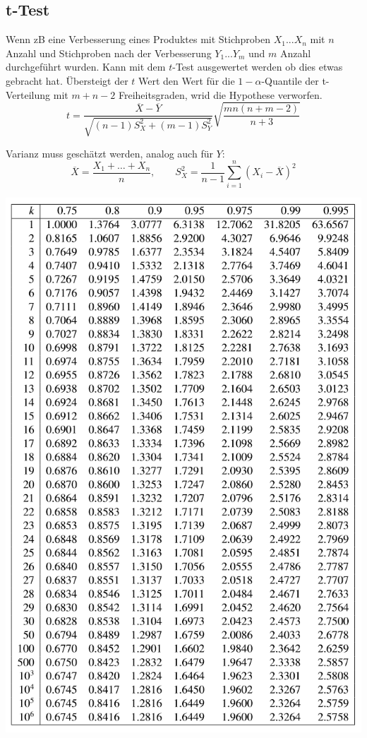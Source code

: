 \subsection{t-Test}
Wenn zB eine Verbesserung eines Produktes mit Stichproben $X_1...X_n$ mit $n$ Anzahl und Stichproben nach der Verbesserung $Y_1...Y_m$ und $m$ Anzahl durchgeführt wurden. Kann mit dem $t$-Test ausgewertet werden ob dies etwas gebracht hat. Übersteigt der $t$ Wert den Wert für die $1-\alpha$-Quantile der t-Verteilung  mit $m+n-2$ Freiheitsgraden, wrid die Hypothese verworfen.
\[
t = \frac{\overline{X} - \overline{Y}}{\sqrt{(n -1)S^2_X + (m -1)S^2_Y}}\sqrt{\frac{mn(n+m-2)}{n+3}}
\]

Varianz muss geschätzt werden, analog auch für $Y$:
\[
\overline{X} = \frac{X_1 + \dots + X_n}{n}, \qquad S^2_X = \frac{1}{n-1}\sum_{i=1}^{n}(X_i - \overline{X})^2
\]

\begin{center}
	\includegraphics[width=0.8\columnwidth]{Images/t-tabelle}
\end{center}

